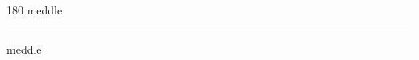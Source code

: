 
\begin{frame}
\begin{center}
\begin{turn}{180}
{\fontsize{2.5cm}{1em}\selectfont meddle}
\end{turn}
\vspace{1em}\par  
\hrule
\vspace{1em}\par  
{\fontsize{2.5cm}{1em}\selectfont meddle}
\end{center}
\end{frame}
